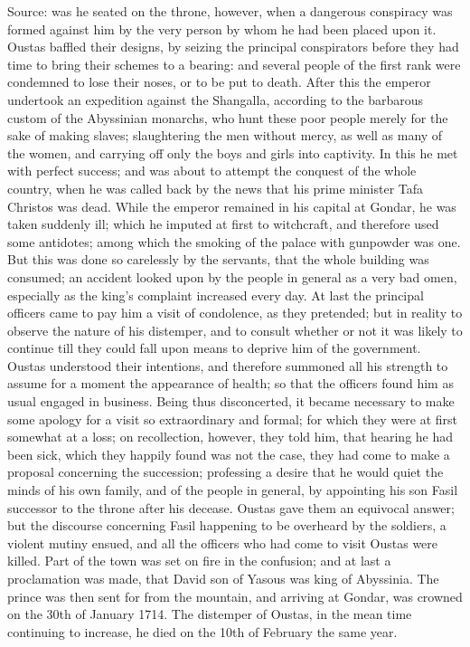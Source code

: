 \documentclass{article}
\begin{document}
Source: was he seated on the throne, however, when a dangerous conspiracy was formed against him by the very person by whom he had been placed upon it. Oustas baffled their designs, by seizing the principal conspirators before they had time to bring their schemes to a bearing: and several people of the first rank were condemned to lose their noses, or to be put to death. After this the emperor undertook an expedition against the Shangalla, according to the barbarous custom of the Abyssinian monarchs, who hunt these poor people merely for the sake of making slaves; slaughtering the men without mercy, as well as many of the women, and carrying off only the boys and girls into captivity. In this he met with perfect success; and was about to attempt the conquest of the whole country, when he was called back by the news that his prime minister Tafa Christos was dead. While the emperor remained in his capital at Gondar, he was taken suddenly ill; which he imputed at first to witchcraft, and therefore used some antidotes; among which the smoking of the palace with gunpowder was one. But this was done so carelessly by the servants, that the whole building was consumed; an accident looked upon by the people in general as a very bad omen, especially as the king's complaint increased every day. At last the principal officers came to pay him a visit of condolence, as they pretended; but in reality to observe the nature of his distemper, and to consult whether or not it was likely to continue till they could fall upon means to deprive him of the government. Oustas understood their intentions, and therefore summoned all his strength to assume for a moment the appearance of health; so that the officers found him as usual engaged in business. Being thus disconcerted, it became necessary to make some apology for a visit so extraordinary and formal; for which they were at first somewhat at a loss; on recollection, however, they told him, that hearing he had been sick, which they happily found was not the case, they had come to make a proposal concerning the succession; professing a desire that he would quiet the minds of his own family, and of the people in general, by appointing his son Fasil successor to the throne after his decease. Oustas gave them an equivocal answer; but the discourse concerning Fasil happening to be overheard by the soldiers, a violent mutiny ensued, and all the officers who had come to visit Oustas were killed. Part of the town was set on fire in the confusion; and at last a proclamation was made, that David son of Yasous was king of Abyssinia. The prince was then sent for from the mountain, and arriving at Gondar, was crowned on the 30th of January 1714. The distemper of Oustas, in the mean time continuing to increase, he died on the 10th of February the same year.
\end{document}
